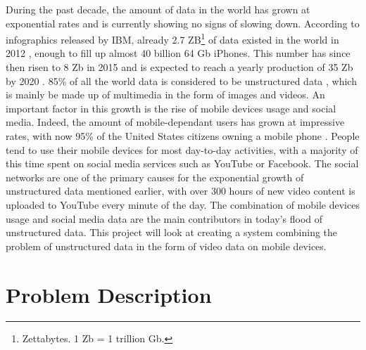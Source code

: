 During the past decade, the amount of data in the world has grown at exponential rates and is currently showing no signs of slowing down. According to infographics released by IBM, already 2.7 ZB\footnote{Zettabytes. 1 Zb = 1 trillion Gb.} of data existed in the world in 2012 \cite{karr_2012}, enough to fill up almost 40 billion 64 Gb iPhones. This number has since then risen to 8 Zb in 2015 and is expected to reach a yearly production of 35 Zb by 2020 \cite{deutscher_2012} \cite{karr_2012}. 85\% of all the world data is considered to be unstructured data \cite{blumberg2003problem}, which is mainly be made up of multimedia in the form of images and videos. An important factor in this growth is the rise of mobile devices usage and social media. Indeed, the amount of mobile-dependant users has grown at impressive rates, with now 95\% of the United States citizens owning a mobile phone \cite{fanning2012increasing}. People tend to use their mobile devices for most day-to-day activities, with a majority of this time spent on social media services such as YouTube or Facebook. The social networks are one of the primary causes for the exponential growth of unstructured data mentioned earlier, with over 300 hours of new video content is uploaded to YouTube every minute of the day. The combination of mobile devices usage and social media data are the main contributors in today's flood of unstructured data. This project will look at creating a system combining the problem of unstructured data in the form of video data on mobile devices.

\section{Problem Description}
\label{sec:problem-description}

